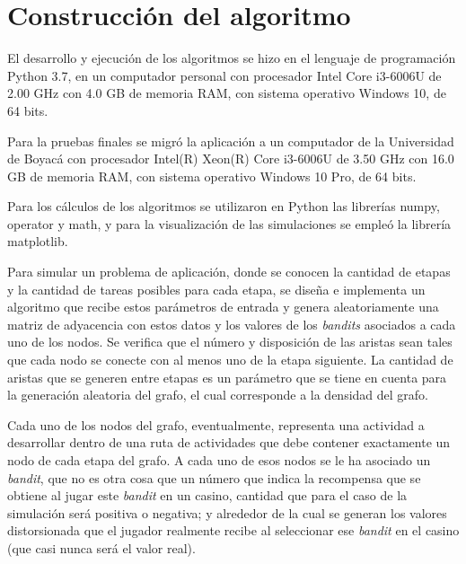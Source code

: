 

\section{Construcción del algoritmo}
\label{algoritmos}
El desarrollo y ejecución de los algoritmos se hizo en el lenguaje de programación
Python 3.7, en un computador personal con procesador Intel Core i3-6006U de 2.00 GHz con 4.0 GB de memoria RAM, con sistema operativo Windows 10, de 64 bits.

Para la pruebas finales se migró la aplicación a un computador de la Universidad de Boyacá con procesador Intel(R) Xeon(R) Core i3-6006U de 3.50 GHz con 16.0 GB de memoria RAM, con sistema operativo Windows 10 Pro, de 64 bits.

Para los cálculos de los algoritmos se utilizaron en Python las librerías numpy, operator y math, y para la visualización de las simulaciones se empleó la librería matplotlib.

Para simular un problema de aplicación, donde se conocen la cantidad de etapas y la cantidad de tareas posibles para cada etapa, se diseña e implementa un algoritmo que recibe estos parámetros de entrada y genera aleatoriamente una matriz de adyacencia con estos datos y los valores de los \textit{bandits} asociados a cada uno de los nodos. Se verifica que el número y disposición de las aristas sean tales que cada nodo se conecte con al menos uno de la etapa siguiente. 
La cantidad de aristas que se generen entre etapas es un parámetro que se tiene en cuenta para la generación aleatoria del grafo, el cual corresponde a la densidad del grafo.

Cada uno de los nodos del grafo, eventualmente, representa una actividad a desarrollar dentro de una ruta de actividades que debe contener exactamente un nodo de cada etapa del grafo. A cada uno de esos nodos se le ha asociado un \textit{bandit}, que no es otra cosa que un número que indica la recompensa que se obtiene al jugar este \textit{bandit} en un casino, cantidad que para el caso de la simulación será positiva o negativa; y alrededor de la cual se generan los valores distorsionada que el jugador realmente recibe al seleccionar ese \textit{bandit} en el casino (que casi nunca será el valor real).

